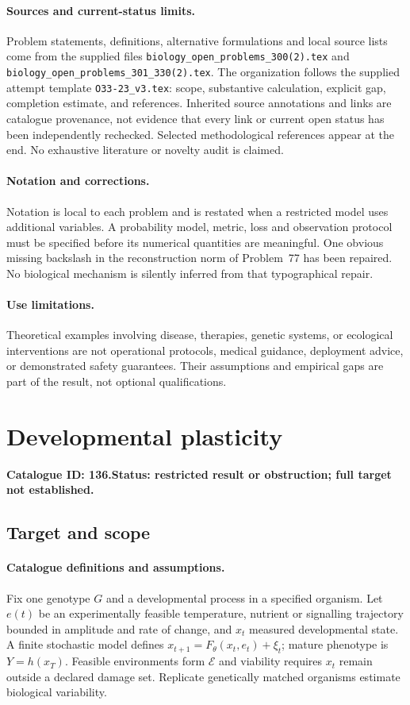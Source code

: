 \documentclass[11pt]{article}
\begin{document}
\paragraph{Sources and current-status limits.}
Problem statements, definitions, alternative formulations and local source lists
come from the supplied files
\texttt{biology\_open\_problems\_300(2).tex} and
\texttt{biology\_open\_problems\_301\_330(2).tex}.
The organization follows the supplied attempt template
\texttt{O33-23\_v3.tex}: scope, substantive calculation, explicit gap,
completion estimate, and references. Inherited source annotations and links are
catalogue provenance, not evidence that every link or current open status has
been independently rechecked. Selected methodological references appear at the
end. No exhaustive literature or novelty audit is claimed.

\paragraph{Notation and corrections.}
Notation is local to each problem and is restated when a restricted model uses
additional variables. A probability model, metric, loss and observation protocol
must be specified before its numerical quantities are meaningful. One obvious
missing backslash in the reconstruction norm of Problem~77 has been repaired.
No biological mechanism is silently inferred from that typographical repair.

\paragraph{Use limitations.}
Theoretical examples involving disease, therapies, genetic systems, or ecological
interventions are not operational protocols, medical guidance, deployment advice,
or demonstrated safety guarantees. Their assumptions and empirical gaps are part
of the result, not optional qualifications.

\setcounter{section}{135}
\section{Developmental plasticity}
\label{prob:136}
\noindent\textbf{Catalogue ID: 136.}\quad \textbf{Status: restricted result or obstruction; full target not established.}
\subsection{Target and scope}
\paragraph{Catalogue definitions and assumptions.}
Fix one genotype $G$ and a developmental process in a specified organism. Let $e(t)$ be an experimentally feasible temperature, nutrient or signalling trajectory bounded in amplitude and rate of change, and $x_t$ measured developmental state. A finite stochastic model defines $x_{t+1}=F_\theta(x_t,e_t)+\xi_t$; mature phenotype is $Y=h(x_T)$. Feasible environments form $\mathcal E$ and viability requires $x_t$ remain outside a declared damage set. Replicate genetically matched organisms estimate biological variability.
\end{document}
